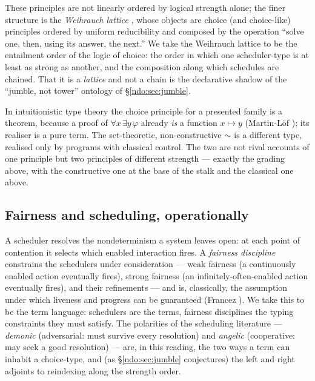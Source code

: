 \noindent
These principles are not linearly ordered by logical strength alone; the finer structure is the
\emph{Weihrauch lattice} \cite{weihrauch}, whose objects are choice (and choice-like) principles
ordered by uniform reducibility and composed by the operation ``solve one, then, using its answer,
the next.'' We take the Weihrauch lattice to be the entailment order of the logic of choice: the
order in which one scheduler-type is at least as strong as another, and the composition along which
schedules are chained. That it is a \emph{lattice} and not a chain is the declarative shadow of the
``jumble, not tower'' ontology of \S\ref{ndo:sec:jumble}.

\begin{remark}
In intuitionistic type theory the choice principle for a presented family is a theorem, because
a proof of $\forall x\,\exists y\,\varphi$ already \emph{is} a function $x \mapsto y$ (Martin-L\"of
\cite{martinlof}); its realiser is a pure term. The set-theoretic, non-constructive $\AC$ is a
different type, realised only by programs with classical control. The two are not rival accounts of
one principle but two principles of different strength --- exactly the grading above, with the
constructive one at the base of the stalk and the classical one above.
\end{remark}

\subsection{Fairness and scheduling, operationally}

A scheduler resolves the nondeterminism a system leaves open: at each point of contention it
selects which enabled interaction fires. A \emph{fairness discipline} constrains the schedulers
under consideration --- weak fairness (a continuously enabled action eventually fires), strong
fairness (an infinitely-often-enabled action eventually fires), and their refinements --- and is,
classically, the assumption under which liveness and progress can be guaranteed (Francez
\cite{francez}). We take this to be the term language: schedulers are the terms, fairness
disciplines the typing constraints they must satisfy. The polarities of the scheduling literature
--- \emph{demonic} (adversarial: must survive every resolution) and \emph{angelic} (cooperative:
may seek a good resolution) --- are, in this reading, the two ways a term can inhabit a choice-type,
and (as \S\ref{ndo:sec:jumble} conjectures) the left and right adjoints to reindexing along the strength
order.

